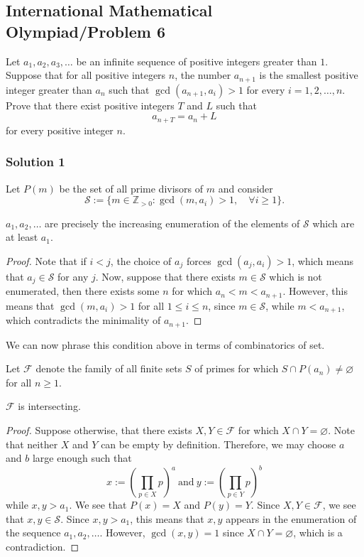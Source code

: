 \documentclass[11pt]{article}
\begin{document}
\subsection{International Mathematical Olympiad/Problem 6}
\begin{problem*}
    Let $a_1, a_2, a_3, \dots$ be an infinite sequence of positive integers greater than $1$. Suppose that for all positive integers $n$, the number $a_{n+1}$ is the smallest positive integer greater than $a_n$ such that $\gcd(a_{n+1}, a_i) > 1$ for every $i = 1, 2, \dots, n$. Prove that there exist positive integers $T$ and $L$ such that
\[
a_{n+T} = a_n + L
\]
for every positive integer $n$.
\end{problem*}
\subsubsection{Solution 1}
Let $P(m)$ be the set of all prime divisors of $m$ and consider
\[ \mathcal{S} := \{ m \in \mathbb{Z}_{>0} :  \gcd(m, a_i) > 1, \quad \forall i \ge 1\}.\]
\begin{claim}
    $a_1, a_2, \dots$ are precisely the increasing enumeration of the elements of $\mathcal{S}$ which are at least $a_1$.
\end{claim}
\begin{proof}
    Note that if $i < j$, the choice of $a_j$ forces $\gcd(a_j, a_i) > 1$, which means that $a_j \in \mathcal{S}$ for any $j$. Now, suppose that there exists $m \in \mathcal{S}$ which is not enumerated, then there exists some $n$ for which $a_n < m < a_{n + 1}$. However, this means that $\gcd(m, a_i) > 1$ for all $1 \le i \le n$, since $m \in \mathcal{S}$, while $m < a_{n + 1}$, which contradicts the minimality of $a_{n + 1}$.
\end{proof}

We can now phrase this condition above in terms of combinatorics of set.

\medskip
Let $\mathcal{F}$ denote the family of all finite sets $S$ of primes for which $S \cap P(a_n) \not= \varnothing$ for all $n \ge 1$.
\begin{claim}
    $\mathcal{F}$ is intersecting.
\end{claim}
\begin{proof}
    Suppose otherwise, that there exists $X, Y\in \mathcal{F}$ for which $X \cap Y = \varnothing$. Note that neither $X$ and $Y$ can be empty by definition. Therefore, we may choose $a$ and $b$ large enough such that
\[ x := \left( \prod_{p \in X} p \right)^{a} \ \text{and} \ y := \left( \prod_{p \in Y} p \right)^{b} \]while $x, y > a_1$. We see that $P(x) = X$ and $P(y) = Y$. Since $X, Y \in \mathcal{F}$, we see that $x, y \in \mathcal{S}$. Since $x, y > a_1$, this means that $x, y$ appears in the enumeration of the sequence $a_1, a_2, \dots$. However, $\gcd(x, y) = 1$ since $X \cap Y = \varnothing$, which is a contradiction.
\end{proof}
\end{document}
